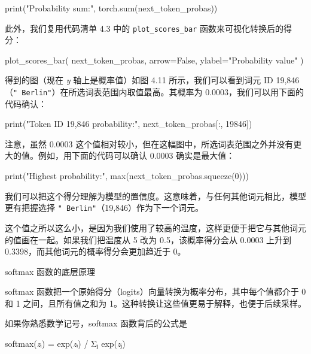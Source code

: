 \begin{codebox}
print("Probability sum:", torch.sum(next_token_probas))
\end{codebox}

此外，我们复用代码清单 4.3 中的 \texttt{plot\_scores\_bar} 函数来可视化转换后的得分：

\begin{codebox}
plot_scores_bar(
    next_token_probas, arrow=False, ylabel="Probability value"
)
\end{codebox}

得到的图（现在 \emph{y} 轴上是概率值）如图 4.11 所示，我们可以看到词元 ID 19,846（\texttt{"}\texttt{ Berlin}\texttt{"}）在所选词表范围内取值最高。其概率为 0.0003，我们可以用下面的代码确认：


\begin{codebox}
print("Token ID 19,846 probability:", next_token_probas[:, 19846])
\end{codebox}

注意，虽然 0.0003 这个值相对较小，但在这幅图中，所选词表范围之外并没有更大的值。例如，用下面的代码可以确认 0.0003 确实是最大值：

\begin{codebox}
print("Highest probability:", max(next_token_probas.squeeze(0)))
\end{codebox}

我们可以把这个得分理解为模型的置信度。这意味着，与任何其他词元相比，模型更有把握选择 \texttt{"}\texttt{ Berlin}\texttt{"}（19,846）作为下一个词元。

这个值之所以这么小，是因为我们使用了较高的温度，这样更便于把它与其他词元的值画在一起。如果我们把温度从 5 改为 0.5，该概率得分会从 0.0003 上升到 0.3398，而其他词元的概率得分会更加趋近于 0。

\begin{mySidebar}{softmax 函数的底层原理}

softmax 函数把一个原始得分（logits）向量转换为概率分布，其中每个值都介于 0 和 1 之间，且所有值之和为 1。这种转换让这些值更易于解释，也便于后续采样。

如果你熟悉数学记号，softmax 函数背后的公式是

\end{mySidebar}

softmax(\emph{z}ᵢ) = exp(\emph{z}ᵢ) / Σⱼ exp(\emph{z}ⱼ)

